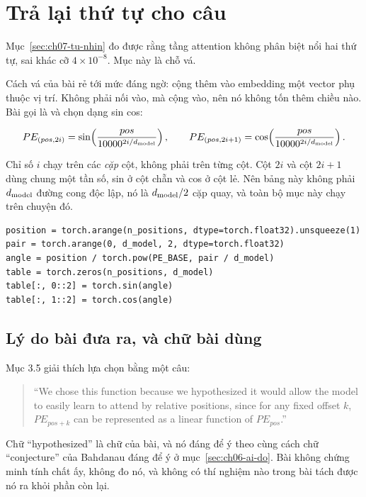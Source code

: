 \section{Trả lại thứ tự cho câu}
\label{sec:ch07-vi-tri}

%
Mục~\ref{sec:ch07-tu-nhin} đo được rằng tầng attention không phân biệt nổi hai
thứ tự, sai khác cỡ \(4 \times 10^{-8}\). Mục này là chỗ vá.

Cách vá của bài rẻ tới mức đáng ngờ: cộng thêm vào embedding một vector phụ
thuộc vị trí. Không phải nối vào, mà cộng vào, nên nó không tốn thêm chiều nào.
Bài gọi là  và chọn dạng sin cos:

\begin{equation}
  PE_{(pos, 2i)} = \sin\!\left( \frac{pos}{10000^{2i/d_{\mathrm{model}}}} \right),
  \qquad
  PE_{(pos, 2i+1)} = \cos\!\left( \frac{pos}{10000^{2i/d_{\mathrm{model}}}} \right).
  \label{eq:ch07-pe}
\end{equation}

Chỉ số \(i\) chạy trên các \emph{cặp} cột, không phải trên từng cột. Cột \(2i\)
và cột \(2i+1\) dùng chung một tần số, sin ở cột chẵn và cos ở cột lẻ. Nên bảng
này không phải \(d_{\mathrm{model}}\) đường cong độc lập, nó là \(d_{\mathrm{model}}/2\) cặp quay, và
toàn bộ mục này chạy trên chuyện đó.

\begin{verbatim}
position = torch.arange(n_positions, dtype=torch.float32).unsqueeze(1)
pair = torch.arange(0, d_model, 2, dtype=torch.float32)
angle = position / torch.pow(PE_BASE, pair / d_model)
table = torch.zeros(n_positions, d_model)
table[:, 0::2] = torch.sin(angle)
table[:, 1::2] = torch.cos(angle)
\end{verbatim}

\subsection*{Lý do bài đưa ra, và chữ bài dùng}

%
Mục 3.5 giải thích lựa chọn bằng một câu:

\begin{quote}
\enquote{We chose this function because we hypothesized it would allow the
model to easily learn to attend by relative positions, since for any fixed
offset \(k\), \(PE_{pos+k}\) can be represented as a linear function of
\(PE_{pos}\).}
\end{quote}

Chữ \enquote{hypothesized} là chữ của bài, và nó đáng để ý theo cùng cách chữ
\enquote{conjecture} của Bahdanau đáng để ý ở
mục~\ref{sec:ch06-ai-do}. Bài không chứng minh tính chất ấy, không đo nó, và
không có thí nghiệm nào trong bài tách được nó ra khỏi phần còn lại.


